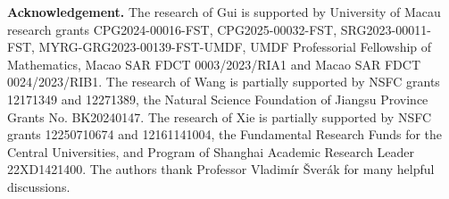 \documentclass[reqno,12pt]{amsart}
\begin{document}





\medskip

{\bf Acknowledgement.}
The research of Gui is supported by University of Macau research grants  CPG2024-00016-FST, CPG2025-00032-FST, SRG2023-00011-FST, MYRG-GRG2023-00139-FST-UMDF, UMDF Professorial Fellowship of Mathematics, Macao SAR FDCT 0003/2023/RIA1 and Macao SAR FDCT 0024/2023/RIB1. The research of Wang is partially supported by NSFC grants 12171349 and 12271389, the Natural Science Foundation of Jiangsu Province Grants No. BK20240147. The research of Xie is partially supported by NSFC grants 12250710674 and  12161141004, the Fundamental Research Funds for the Central Universities, and Program of Shanghai Academic Research Leader 22XD1421400. The authors thank Professor Vladim\'ir \v{S}ver\'ak for many helpful discussions.
\end{document}

